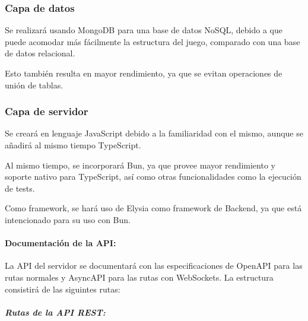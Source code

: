 \subsubsection{Capa de datos}
Se realizará usando MongoDB para una base de datos NoSQL,
debido a que puede acomodar más fácilmente la estructura del juego,
comparado con una base de datos relacional.

Esto también resulta en mayor rendimiento, ya que se evitan operaciones de unión de tablas.


\subsubsection{Capa de servidor}
Se creará en lenguaje JavaScript debido a la familiaridad con el mismo, aunque se añadirá al mismo tiempo TypeScript. 

Al mismo tiempo, se incorporará Bun,
ya que provee mayor rendimiento y soporte nativo para TypeScript,
así como otras funcionalidades como la ejecución de tests. 

Como framework, se hará uso de Elysia como framework de Backend, ya que está intencionado para su uso con Bun. 

\paragraph{Documentación de la API:}

La API del servidor se documentará con las especificaciones de OpenAPI para las rutas normales y AsyncAPI para las rutas con WebSockets.
La estructura consistirá de las siguintes rutas:

\subparagraph{Rutas de la API REST:}

